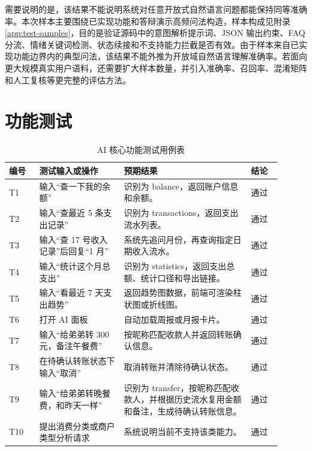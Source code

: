 \documentclass[bachelor, print]{xduthesis}
\begin{document}
需要说明的是，该结果不能说明系统对任意开放式自然语言问题都能保持同等准确率。本次样本主要围绕已实现功能和答辩演示高频问法构造，样本构成见附录 \ref{app:test-samples}，目的是验证源码中的意图解析提示词、JSON 输出约束、FAQ 分流、情绪关键词检测、状态续接和不支持能力拦截是否有效。由于样本来自已实现功能边界内的典型问法，该结果不能外推为开放域自然语言理解准确率。若面向更大规模真实用户语料，还需要扩大样本数量，并引入准确率、召回率、混淆矩阵和人工复核等更完整的评估方法。

\section{功能测试}

\begin{table}[H]
    \centering
    \caption{AI 核心功能测试用例表}
    \label{tab:test-cases}
    \begin{tabular}{|p{0.1\linewidth}|p{0.28\linewidth}|p{0.42\linewidth}|p{0.1\linewidth}|}
        \hline
        编号 & 测试输入或操作 & 预期结果 & 结论 \\
        \hline
        T1 & 输入“查一下我的余额” & 识别为 balance，返回账户信息和余额。 & 通过 \\
        \hline
        T2 & 输入“查最近 5 条支出记录” & 识别为 transactions，返回支出流水列表。 & 通过 \\
        \hline
        T3 & 输入“查 17 号收入记录”后回复“1 月” & 系统先追问月份，再查询指定日期收入流水。 & 通过 \\
        \hline
        T4 & 输入“统计这个月总支出” & 识别为 statistics，返回支出总额、统计口径和导出链接。 & 通过 \\
        \hline
        T5 & 输入“看最近 7 天支出趋势” & 返回趋势图数据，前端可渲染柱状图或折线图。 & 通过 \\
        \hline
        T6 & 打开 AI 面板 & 自动加载周报或月报卡片。 & 通过 \\
        \hline
        T7 & 输入“给弟弟转 300 元，备注午餐费” & 按昵称匹配收款人并返回转账确认信息。 & 通过 \\
        \hline
        T8 & 在待确认转账状态下输入“取消” & 取消转账并清除待确认状态。 & 通过 \\
        \hline
        T9 & 输入“给弟弟转晚餐费，和昨天一样” & 识别为 transfer，按昵称匹配收款人，并根据历史流水复用金额和备注，生成待确认转账信息。 & 通过 \\
        \hline
        T10 & 提出消费分类或商户类型分析请求 & 系统说明当前不支持该类能力。 & 通过 \\
        \hline

\end{tabular}
\end{table}
\end{document}
